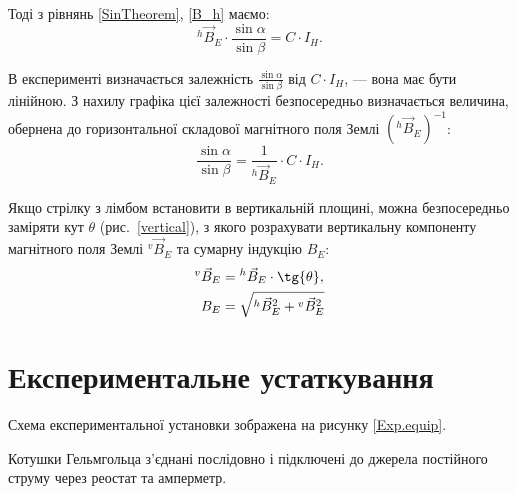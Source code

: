 Тоді з рівнянь \eqref{SinTheorem}, \eqref{B_h} %
маємо:
\begin{equation} \label{h_B_E}
     {}^{h}\vec{B}_{E} \cdot  \frac{\sin{\alpha}}{\sin{\beta}} = C \cdot I_{H}.
\end{equation}

В експерименті визначається залежність $\frac{\sin{\alpha}}{\sin{\beta}}$ від $C \cdot I_{H} $, --- вона має бути лінійною.
З нахилу графіка цієї залежності безпосередньо визначається
%
величина, обернена
до горизонтальної складової магнітного поля Землі
$({}^{h}\vec{B}_{E})^{-1}$:
%
\begin{equation} \label{fsin}
        \frac{\sin{\alpha}}{\sin{\beta}} = \frac{1}{{}^{h}\vec{B}_{E}} \cdot C \cdot I_{H}.
\end{equation}

Якщо стрілку з лімбом встановити в вертикальній площині, можна безпосередньо заміряти кут $\theta$ (рис.~\ref{vertical}), з якого розрахувати вертикальну компоненту магнітного поля Землі ${}^{v}\vec{B}_{E}$ та сумарну індукцію $B_{E}$:
\begin{align}\label{VerticalComp.MagneticFieldEarth}
    {}^{v}\vec{B}_{E} &=   {}^{h}\vec{B}_{E} \cdot \tg{\theta}, \\
     B_{E} &= \sqrt{ {}^{h}\vec{B}_{E}^2 + {}^{v}\vec{B}_{E}^2 }
\end{align}

\section{Експериментальне устаткування}
Схема експериментальної установки зображена на рисунку \ref{Exp.equip}.

Котушки Гельмгольца з'єднані послідовно і підключені до джерела постійного струму через реостат та амперметр.

